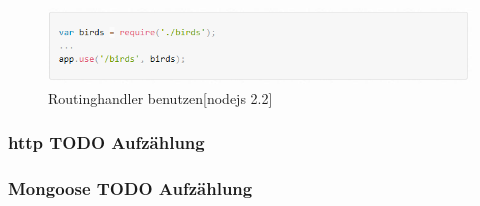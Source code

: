 \begin{figure}[h]
\centering
\includegraphics[width=14cm]{images/nodejs_expressRouterbenutzen.PNG}
\caption{Routinghandler benutzen[nodejs 2.2]}
\end{figure}



\subsubsection{http TODO Aufzählung}

\subsubsection{Mongoose TODO Aufzählung}